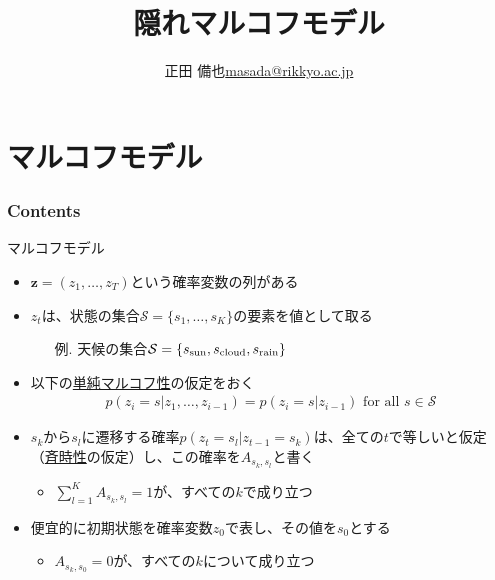 \documentclass[aspectratio=169,unicode,dvipdfmx,14pt]{beamer}
\title{ \\隠れマルコフモデル}
\author{\texorpdfstring{正田 備也\newline\href{mailto:masada@rikkyo.ac.jp}{masada@rikkyo.ac.jp}}{正田 備也}}
\date{}
\begin{document}
\begin{frame}
\titlepage
\end{frame}

\section{マルコフモデル}

\begin{frame}\frametitle{Contents}
\Large \tableofcontents[currentsection]
\end{frame}

\begin{frame}{マルコフモデル}
\begin{itemize}
\item $\bm{z} = (z_1,\ldots,z_T)$という確率変数の列がある
\item $z_t$は、状態の集合$\mathcal{S} = \{ s_1, \ldots, s_K \}$の要素を値として取る
\begin{itemize}
\item[例.] 天候の集合$\mathcal{S} = \{ s_{\mbox{\scriptsize sun}}, s_{\mbox{\scriptsize cloud}}, s_{\mbox{\scriptsize rain}} \}$
\end{itemize}
\item 以下の\underline{単純マルコフ性}の仮定をおく
\vspace{-.1in}
\begin{align}
p(z_i =s | z_1,\ldots, z_{i-1}) = p(z_i =s | z_{i-1}) \mbox{ for all $s \in \mathcal{S}$}
\end{align}
\item $s_k$から$s_l$に遷移する確率$p(z_t=s_l|z_{t-1}=s_k)$は、全ての$t$で等しいと仮定（\underline{斉時性}の仮定）し、この確率を$A_{s_k,s_l}$と書く
\begin{itemize}
\item $\sum_{l=1}^K A_{s_k, s_l} = 1$が、すべての$k$で成り立つ
\end{itemize}
\item 便宜的に初期状態を確率変数$z_0$で表し、その値を$s_0$とする
\begin{itemize}
\item $A_{s_k,s_0} = 0$が、すべての$k$について成り立つ
\end{itemize}
\end{itemize}
\end{frame}
\end{document}
